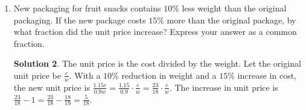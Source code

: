 \documentclass{article}
\theoremstyle{definition}
\newtheorem*{solution}{Solution}
\begin{document}
\begin{enumerate}
        \begin{solution}
            Multiply the ratios together to get $\frac{x}{y} \cdot \frac{y}{z} =
            \frac{x}{z} = \frac{2}{3} = \frac{3}{2} = 1$.
        \end{solution}
        \item New packaging for fruit snacks contains $10\%$ less weight than
        the original packaging. If the new package costs $15\%$ more than the
        original package, by what fraction did the unit price increase? Express
        your answer as a common fraction.
        \begin{solution}
            The unit price is the cost divided by the weight. Let the original
            unit price be $\frac{c}{w}$. With a $10\%$ reduction in weight and a
            $15\%$ increase in cost, the new unit price is $\frac{1.15c}{0.9w} =
            \frac{1.15}{0.9} \cdot \frac{c}{w} = \frac{23}{18} \cdot
            \frac{c}{w}$. The increase in unit price is $\frac{23}{18} - 1 =
            \frac{23}{18} - \frac{18}{19} = \frac{5}{18}$.
        \end{solution}
    \end{enumerate}
\end{document}
